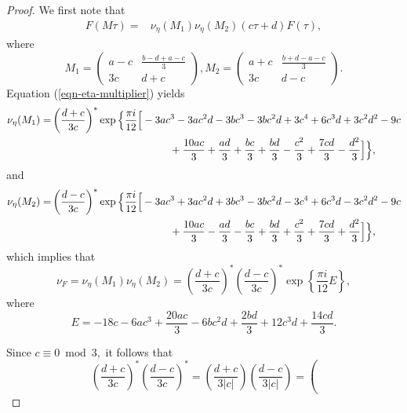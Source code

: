\documentclass[12pt]{article}
\theoremstyle{definition}
\numberwithin{equation}{section}
\numberwithin{theorem}{section}
\begin{document}
\begin{proof}
We first note that 
\begin{align*}
F(M\tau)=&
\nu_{\eta}(M_1) \nu_{\eta} (M_2)
(c\tau+d)F(\tau),
\end{align*}
where 
\begin{equation*}
M_1
=
\begin{pmatrix}
a-c & \frac{ b-d+a-c }{3} \\
3c & d+c
\end{pmatrix}, 
M_2
=
\begin{pmatrix}
a+c & \frac{ b+d-a-c }{3} \\
3c & d-c
\end{pmatrix}. 
\end{equation*}
Equation (\ref{eqn-eta-multiplier})
yields 
\begin{align*}
\nu_{\eta}(M_1)=&
\left(
\frac{d+c}{3c}
\right)^{*}  
\exp
\Big\{
\frac{\pi i}{12}
\Big[
-3 a c^3-3 a c^2 d-3 b c^3-3 b c^2 d +3 c^4+6 c^3 d+3 c^2 d^2 -9 c  \\
&
\hspace{40mm}
+\frac{10 a c}{3}+\frac{a d}{3}
+\frac{b c}{3}+\frac{b d}{3}
-\frac{c^2}{3}+\frac{7 c d}{3}-\frac{d^2}{3}
\Big]
\Big\},
\end{align*}
and 
\begin{align*}
\nu_{\eta}(M_2)=&
\left(
\frac{d-c}{3c}
\right)^{*}  
\exp 
\Big\{
\frac{\pi i}{12}
\Big[
-3 a c^3+3 a c^2 d+3 b c^3-3 b c^2 d-3 c^4+6 c^3 d-3 c^2 d^2-9 c  \\
&
\hspace{40mm}
+\frac{10 a c}{3}-\frac{a d}{3}-\frac{b c}{3}+\frac{b d}{3}
+\frac{c^2}{3}+\frac{7 c d}{3}+\frac{d^2}{3}
\Big]
\Big\},
\end{align*}
which implies that 
\begin{equation*}
\nu_{F}
=
\nu_{\eta}(M_1) \nu_{\eta} (M_2)
=
\left(
\frac{d+c}{3c}
\right)^{*}  
\left(
\frac{d-c}{3c}
\right)^{*}  
\exp
\left\{
\frac{\pi i}{12}
E
\right\}, 
\end{equation*}
where 
\begin{equation*}
E=
-18 c
-6 a c^3+\frac{20 a c}{3}-6 b c^2 d+\frac{2 b d}{3}+12 c^3 d+\frac{14 c d}{3}. 
\end{equation*}
\par
Since $c\equiv 0 \bmod{3},$ it follows that 
\begin{equation*}
\left(
\frac{d+c}{3c}
\right)^{*}  
\left(
\frac{d-c}{3c}
\right)^{*}  
=
\left(
\frac{d+c}{3 |c|}
\right) 
\left(
\frac{d-c}{3 |c|}
\right)=
\left(

\end{equation*}
\end{proof}
\end{document}

